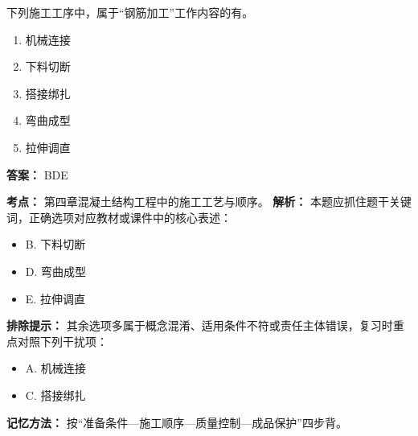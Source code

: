\documentclass[UTF8,fontset=fandol,11pt]{ctexart}
\begin{document}
\begin{quizbox}[title={第 21 题}]
下列施工工序中，属于“钢筋加工”工作内容的有。\\
\begin{enumerate}[label=\Alph*.]
\item 机械连接
\item 下料切断
\item 搭接绑扎
\item 弯曲成型
\item 拉伸调直
\end{enumerate}
\textbf{答案：} BDE
\vspace{0.25em}
\begin{answerbox}[title={考点解析}]
\textbf{考点：} 第四章混凝土结构工程中的施工工艺与顺序。
\textbf{解析：} 本题应抓住题干关键词，正确选项对应教材或课件中的核心表述：
\begin{itemize}
\item B. 下料切断
\item D. 弯曲成型
\item E. 拉伸调直
\end{itemize}
\textbf{排除提示：} 其余选项多属于概念混淆、适用条件不符或责任主体错误，复习时重点对照下列干扰项：
\begin{itemize}
\item A. 机械连接
\item C. 搭接绑扎
\end{itemize}
\textbf{记忆方法：} 按“准备条件—施工顺序—质量控制—成品保护”四步背。
\end{answerbox}
\end{quizbox}

\vspace{0.2em}
\end{document}
